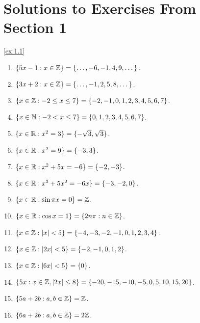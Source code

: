 
\section*{Solutions to Exercises From Section 1}

\begin{solution}\label{sol:1.1}\ref{ex:1.1}
\begin{enumerate}
    \item $\{ 5x-1:x\in\mathbb{Z} \}=\{ \dots,-6,-1,4,9,\dots \}$.
    \item $\{ 3x+2:x\in\mathbb{Z} \}=\{ \dots,-1,2,5,8,\dots \}$. 
    \item $\{ x\in\mathbb{Z}: -2\le x\le 7\}=\{ -2,-1,0,1,2,3,4,5,6,7 \}$. 
    \item $\{ x\in\mathbb{N}:-2 < x \le 7 \}=\{ 0,1,2,3,4,5,6,7 \}$.
    \item $\{ x\in\mathbb{R}:x^2=3 \}=\{ -\sqrt 3, \sqrt 3 \}$.
    \item $\{ x\in\mathbb{R}:x^2=9 \}=\{ -3,3 \}$.
    \item $\{ x\in\mathbb{R}:x^2+5x=-6 \}=\{ -2,-3 \}$.
    \item $\{ x\in\mathbb{R}:x^3+5x^2=-6x \}=\{ -3,-2,0 \}$.
    \item $\{ x\in\mathbb{R}:\sin\pi x=0 \}=\mathbb{Z}$.
    \item $\{ x\in\mathbb{R}:\cos x=1 \}=\{ 2n\pi:n\in\mathbb{Z} \}$.
    \item $\{ x\in\mathbb{Z}:\lvert x \rvert<5 \}=\{ -4,-3,-2,-1,0,1,2,3,4 \}$.
    \item $\{ x\in\mathbb{Z}: \lvert 2x \rvert<5 \}=\{ -2,-1,0,1,2 \}$.
    \item $\{ x\in\mathbb{Z}:\lvert 6x \rvert<5 \}=\{ 0 \}$.
    \item $\{ 5x:x\in\mathbb{Z},\lvert 2x \rvert\le8 \}=\{ -20,-15,-10,-5,0,5,10,15,20 \}$.
    \item $\{ 5a+2b:a,b\in\mathbb{Z} \}=\mathbb{Z}$.
    \item $\{ 6a+2b:a,b\in\mathbb{Z} \}=2\mathbb{Z}$.
\end{enumerate}

\end{solution}

